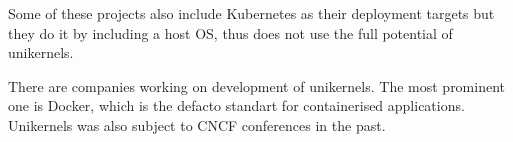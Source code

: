 Some of these projects also include Kubernetes as their deployment targets but they do it by including a host OS, thus does not use the full potential of unikernels.

There are companies working on development of unikernels. The most prominent one is Docker, which is the defacto standart for containerised applications. \cite{francia_2016} Unikernels was also subject to CNCF conferences in the past.